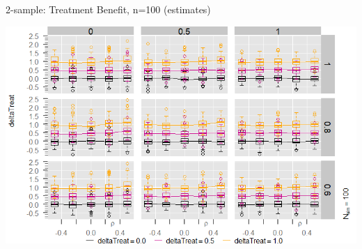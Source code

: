 

\begin{frame}{2-sample: Treatment Benefit, n=100 (estimates)} %

\begin{center}
  \includegraphics[width=1.00\textwidth]{Figure3/mayplot3-deltaTreat-n100.png}
\end{center}

\end{frame}


